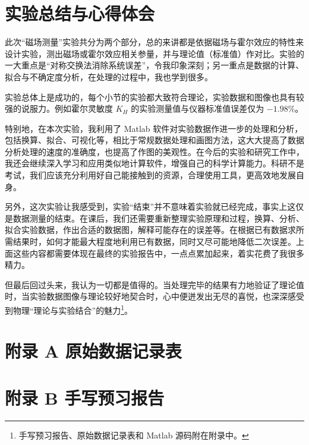 \documentclass[UTF8]{article}
\theoremstyle{MyLineTheoremStyle} %
\theoremstyle{MyBlockTheoremStyle} %
\theoremstyle{MySubsubsectionStyle} %
\begin{document}
\section{实验总结与心得体会}
此次“磁场测量”实验共分为两个部分，总的来讲都是依据磁场与霍尔效应的特性来设计实验，测出磁场或霍尔效应相关参量，并与理论值（标准值）作对比。实验的一大重点是“对称交换法消除系统误差”，令我印象深刻；另一重点是数据的计算、拟合与不确定度分析，在处理的过程中，我也学到很多。

实验总体上是成功的，每个小节的实验都大致符合理论，实验数据和图像也具有较强的说服力。例如霍尔灵敏度 $K_H$ 的实验测量值与仪器标准值误差仅为 $-1.98 \%$。

特别地，在本次实验，我利用了 Matlab 软件对实验数据作进一步的处理和分析，包括换算、拟合、可视化等，相比于常规数据处理和画图方法，这大大提高了数据分析处理的速度的准确度，也提高了作图的美观性。在今后的实验和研究工作中，我还会继续深入学习和应用类似地计算软件，增强自己的科学计算能力。科研不是考试，我们应该充分利用好自己能接触到的资源，合理使用工具，更高效地发展自身。

另外，这次实验让我感受到，实验“结束”并不意味着实验就已经完成，事实上这仅是数据测量的结束。在课后，我们还需要重新整理实验原理和过程，换算、分析、拟合实验数据，作出合适的数据图，解释可能存在的误差等。在根据已有数据求所需结果时，如何才能最大程度地利用已有数据，同时又尽可能地降低二次误差。上面这些内容都需要体现在最终的实验报告中，一点点累加起来，着实花费了我很多精力。

但最后回过头来，我认为一切都是值得的。当处理完毕的结果有力地验证了理论值时，当实验数据图像与理论较好地契合时，心中便迸发出无尽的喜悦，也深深感受到物理“理论与实验结合”的魅力\footnote{手写预习报告、原始数据记录表和 Matlab 源码附在附录中。}。

\newpage
\section*{附录 A\hspace*{20pt} 原始数据记录表}
\thispagestyle{fancy} 

\begin{figure}[H]\centering
    
\end{figure}


\section*{附录 B\hspace*{20pt} 手写预习报告}
\thispagestyle{fancy} 
\end{document}

